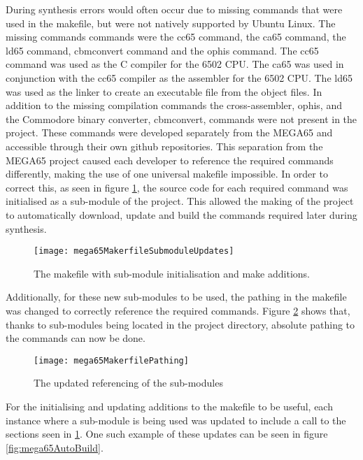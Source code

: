 \label{Ch4 Sec1 Sub1}

During synthesis errors would often occur due to missing commands that were used in the makefile, but were not natively supported by Ubuntu Linux. The missing commands commands were the cc65 command, the ca65 command, the ld65 command, cbmconvert command and the ophis command. The cc65 command was used as the C compiler for the 6502 CPU. The ca65 was used in conjunction with the cc65 compiler as the assembler for the 6502 CPU. The ld65 was used as the linker to create an executable file from the object files. In addition to the missing compilation commands the cross-assembler, ophis, and the Commodore binary converter, cbmconvert, commands were not present in the project. These commands were developed separately from the MEGA65 and accessible through their own github repositories. This separation from the MEGA65 project caused each developer to reference the required commands differently, making the use of one universal makefile impossible. In order to correct this, as seen in figure \ref{fig:mega65MakerfileSubmodulesUpdates}, the source code for each required command was initialised as a sub-module of the project. This allowed the making of the project to automatically download, update and build the commands required later during synthesis.\\

\begin{figure}
  \centering
  \texttt{[image: mega65MakerfileSubmoduleUpdates]}
  \caption{The makefile with sub-module initialisation and make additions.}
  \label{fig:mega65MakerfileSubmodulesUpdates}
\end{figure}

Additionally, for these new sub-modules to be used, the pathing in the makefile was changed to correctly reference the required commands. Figure \ref{fig:mega65MakerfilePathing} shows that, thanks to sub-modules being located in the project directory, absolute pathing to the commands can now be done.\\

\begin{figure}
  \centering
  \texttt{[image: mega65MakerfilePathing]}
  \caption{The updated referencing of the sub-modules}
  \label{fig:mega65MakerfilePathing}
\end{figure}

For the initialising and updating additions to the makefile to be useful, each instance where a sub-module is being used was updated to include a call to the sections seen in \ref{fig:mega65MakerfileSubmodulesUpdates}. One such example of these updates can be seen in figure \ref{fig:mega65AutoBuild}.\\

